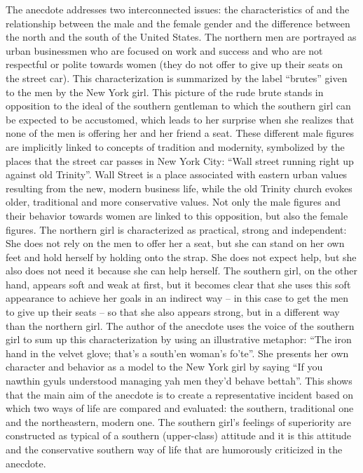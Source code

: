 The anecdote addresses two interconnected issues: the characteristics of and the relationship between the male and the female gender and the difference between the north and the south of the United States. The northern men are portrayed as urban businessmen who are focused on work and success and who are not respectful or polite towards women (they do not offer to give up their seats on the street car). This characterization is summarized by the label “brutes” given to the men by the New York girl. This picture of the rude brute stands in opposition to the ideal of the southern gentleman to which the southern girl can be expected to be accustomed, which leads to her surprise when she realizes that none of the men is offering her and her friend a seat. These different male figures are implicitly linked to concepts of tradition and modernity, symbolized by the places that the street car passes in New York City: “Wall street running right up against old Trinity”. Wall Street is a place associated with eastern urban values resulting from the new, modern business life, while the old Trinity church evokes older, traditional and more conservative values. Not only the male figures and their behavior towards women are linked to this opposition, but also the female figures. The northern girl is characterized as practical, strong and independent: She does not rely on the men to offer her a seat, but she can stand on her own feet and hold herself by holding onto the strap. She does not expect help, but she also does not need it because she can help herself. The southern girl, on the other hand, appears soft and weak at first, but it becomes clear that she uses this soft appearance to achieve her goals in an indirect way – in this case to get the men to give up their seats – so that she also appears strong, but in a different way than the northern girl. The author of the anecdote uses the voice of the southern girl to sum up this characterization by using an illustrative metaphor: “The iron hand in the velvet glove; that’s a south’en woman’s fo’te”. She presents her own character and behavior as a model to the New York girl by saying “If you nawthin gyuls understood managing yah men they’d behave bettah”. This shows that the main aim of the anecdote is to create a representative incident based on which two ways of life are compared and evaluated: the southern, traditional one and the northeastern, modern one. The southern girl’s feelings of superiority are constructed as typical of a southern (upper-class) attitude and it is this attitude and the conservative southern way of life that are humorously criticized in the anecdote.

